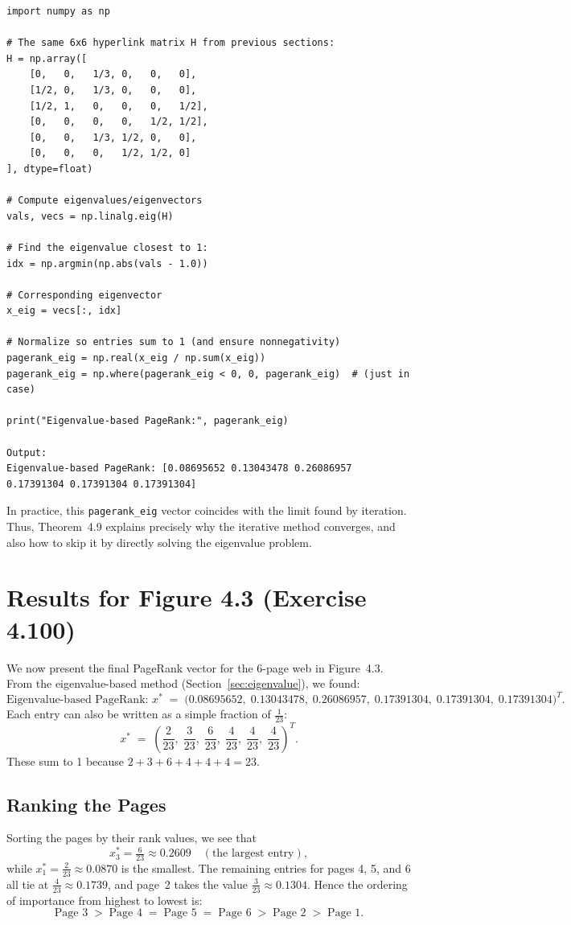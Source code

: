 \documentclass{article}
\begin{document}
\begin{verbatim}
import numpy as np

# The same 6x6 hyperlink matrix H from previous sections:
H = np.array([
    [0,   0,   1/3, 0,   0,   0],
    [1/2, 0,   1/3, 0,   0,   0],
    [1/2, 1,   0,   0,   0,   1/2],
    [0,   0,   0,   0,   1/2, 1/2],
    [0,   0,   1/3, 1/2, 0,   0],
    [0,   0,   0,   1/2, 1/2, 0]
], dtype=float)

# Compute eigenvalues/eigenvectors
vals, vecs = np.linalg.eig(H)

# Find the eigenvalue closest to 1:
idx = np.argmin(np.abs(vals - 1.0))

# Corresponding eigenvector
x_eig = vecs[:, idx]

# Normalize so entries sum to 1 (and ensure nonnegativity)
pagerank_eig = np.real(x_eig / np.sum(x_eig))
pagerank_eig = np.where(pagerank_eig < 0, 0, pagerank_eig)  # (just in case)

print("Eigenvalue-based PageRank:", pagerank_eig)

Output:
Eigenvalue-based PageRank: [0.08695652 0.13043478 0.26086957 0.17391304 0.17391304 0.17391304]
\end{verbatim}

\noindent
In practice, this \texttt{pagerank\_eig} vector coincides with the limit found by iteration. 
Thus, Theorem~4.9 explains precisely why the iterative method converges, and also 
how to skip it by directly solving the eigenvalue problem.



\section{Results for Figure 4.3 (Exercise 4.100)}

We now present the final PageRank vector for the 6-page web in Figure~4.3. 
From the eigenvalue-based method (Section~\ref{sec:eigenvalue}), we found:
\[
\text{Eigenvalue-based PageRank: } 
x^* 
\;=\;
\bigl(
0.08695652,\;
0.13043478,\;
0.26086957,\;
0.17391304,\;
0.17391304,\;
0.17391304
\bigr)^T.
\]
\noindent
Each entry can also be written as a simple fraction of $\tfrac{1}{23}$:
\[
x^* 
\;=\;
\left(
\frac{2}{23},\;
\frac{3}{23},\;
\frac{6}{23},\;
\frac{4}{23},\;
\frac{4}{23},\;
\frac{4}{23}
\right)^T.
\]
These sum to 1 because $2 + 3 + 6 + 4 + 4 + 4 = 23$.

\subsection*{Ranking the Pages}
Sorting the pages by their rank values, we see that 
\[
x^*_3 = \tfrac{6}{23} \approx 0.2609 
\quad
(\text{the largest entry}),
\]
while $x^*_1 = \tfrac{2}{23} \approx 0.0870$ 
is the smallest. The remaining entries for 
pages 4, 5, and 6 all tie at $\tfrac{4}{23} \approx 0.1739$, 
and page~2 takes the value $\tfrac{3}{23} \approx 0.1304$. 
Hence the ordering of importance from highest to lowest is:
\[
\text{Page }3 
\;>\;
\text{Page }4 \;=\; \text{Page }5 \;=\; \text{Page }6
\;>\;
\text{Page }2
\;>\;
\text{Page }1.
\]
\end{document}
